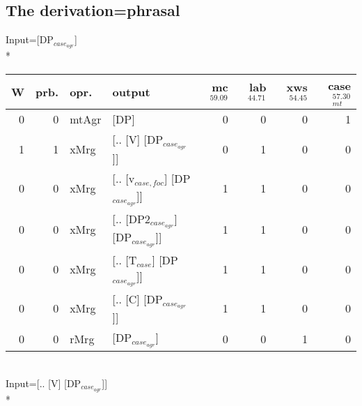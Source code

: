\subsection{The derivation=phrasal}
\begingroup\scriptsize Input=[DP$_{case_{agr}}$]\\*
\begin{tabularx}{\linewidth}{rrlXrrrr}
\hline
   W &   prb. & opr.    & output                            &   mc$^{59.09}$ &   lab$^{44.71}$ &   xws$^{54.45}$ &   case$_{mt}^{57.30}$ \\
\hline
   0 &   0 & mtAgr & [DP]                              &            0 &             0 &             0 &                 1 \\
   1 &   1 & xMrg  & [.. [V] [DP$_{case_{agr}}$]]            &            0 &             1 &             0 &                 0 \\
   0 &   0 & xMrg  & [.. [v$_{case,foc}$] [DP$_{case_{agr}}$]]   &            1 &             1 &             0 &                 0 \\
   0 &   0 & xMrg  & [.. [DP2$_{case_{agr}}$] [DP$_{case_{agr}}$]] &            1 &             1 &             0 &                 0 \\
   0 &   0 & xMrg  & [.. [T$_{case}$] [DP$_{case_{agr}}$]]       &            1 &             1 &             0 &                 0 \\
   0 &   0 & xMrg  & [.. [C] [DP$_{case_{agr}}$]]            &            1 &             1 &             0 &                 0 \\
   0 &   0 & rMrg  & [DP$_{case_{agr}}$]                     &            0 &             0 &             1 &                 0 \\
\hline
\end{tabularx}\endgroup\\
\begingroup\scriptsize Input=[.. [V] [DP$_{case_{agr}}$]]\\*

